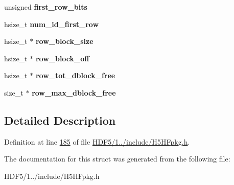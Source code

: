 \begin{DoxyCompactItemize}
unsigned {\bfseries first\+\_\+row\+\_\+bits}
\item 
\mbox{\label{struct_h5_h_f__dtable__t_a8477c120a7c62eb4c8811201c72b90b5}} 
hsize\+\_\+t {\bfseries num\+\_\+id\+\_\+first\+\_\+row}
\item 
\mbox{\label{struct_h5_h_f__dtable__t_ae0fc99106c2ccf4ea7b5187ae8ca0604}} 
hsize\+\_\+t $\ast$ {\bfseries row\+\_\+block\+\_\+size}
\item 
\mbox{\label{struct_h5_h_f__dtable__t_a6e60a7df83ecce20b6bb984791b31ee3}} 
hsize\+\_\+t $\ast$ {\bfseries row\+\_\+block\+\_\+off}
\item 
\mbox{\label{struct_h5_h_f__dtable__t_aaf5830265d927f34dbb182a9169e8457}} 
hsize\+\_\+t $\ast$ {\bfseries row\+\_\+tot\+\_\+dblock\+\_\+free}
\item 
\mbox{\label{struct_h5_h_f__dtable__t_a659697ae21f6bf1f43289b2126e9f9b8}} 
size\+\_\+t $\ast$ {\bfseries row\+\_\+max\+\_\+dblock\+\_\+free}
\end{DoxyCompactItemize}


\subsection{Detailed Description}


Definition at line \hyperlink{_h_d_f5_21_810_81_2include_2_h5_h_fpkg_8h_source_l00185}{185} of file \hyperlink{_h_d_f5_21_810_81_2include_2_h5_h_fpkg_8h_source}{H\+D\+F5/1../include/\+H5\+H\+Fpkg.\+h}.



The documentation for this struct was generated from the following file\+:\begin{DoxyCompactItemize}
\item 
H\+D\+F5/1../include/\+H5\+H\+Fpkg.\+h\end{DoxyCompactItemize}

